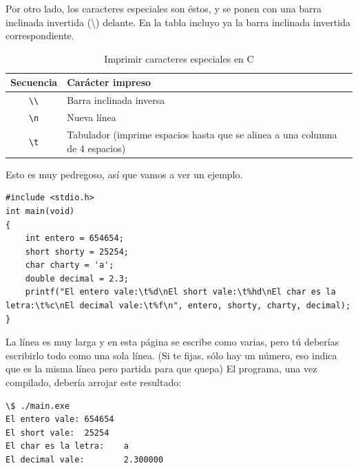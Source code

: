 \documentclass[a4paper]{article}
\begin{document}
Por otro lado, los caracteres especiales son éstos, y se ponen con una barra
inclinada invertida (\textbackslash{}) delante. En la tabla incluyo ya la barra
inclinada invertida correspondiente.

\begin{table}[H]
\centering
\begin{tabularx}{\linewidth}{|c|Y|}
\hline
\textbf{Secuencia} & \textbf{Carácter impreso} \\\hline
\texttt{\textbackslash{}\textbackslash{}} & Barra inclinada inversa            \\\hline
\texttt{\textbackslash{}n}& Nueva línea                         \\\hline
\texttt{\textbackslash{}t}& Tabulador (imprime espacios hasta que se alinea a una columna de 4 espacios)   \\\hline
\end{tabularx}
\caption{Imprimir caracteres especiales en C}
\label{tab:specialCharsC}
\end{table}

Esto es muy pedregoso, así que vamos a ver un ejemplo.



\noindent
\begin{minipage}[H]{\linewidth}
\mbox{}
\begin{lstlisting}[style=C, caption={Ejemplo de impresión.},
label={lst:decimalvsintergerDivision}]
#include <stdio.h>
int main(void)
{
    int entero = 654654;
    short shorty = 25254;
    char charty = 'a';
    double decimal = 2.3;
    printf("El entero vale:\t%d\nEl short vale:\t%hd\nEl char es la letra:\t%c\nEl decimal vale:\t%f\n", entero, shorty, charty, decimal);
}
\end{lstlisting}
\end{minipage}


La línea es muy larga y en esta página se escribe como varias, pero tú deberías
escribirlo todo como una sola línea. (Si te fijas, sólo hay un número, eso
indica que es la misma línea pero partida para que quepa) El programa, una vez
compilado, debería arrojar este resultado:



\noindent
\begin{minipage}[H]{\linewidth}
\mbox{}
\begin{lstlisting}[style=terminalStyle]
\$ ./main.exe
El entero vale: 654654
El short vale:  25254
El char es la letra:    a
El decimal vale:        2.300000
\end{lstlisting}
\end{minipage}
\end{document}

